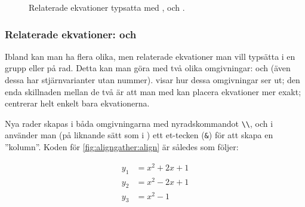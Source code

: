 \documentclass[lang=sv,ptsize=10pt,font=none,nomath,titles=bf,../../a4.tex]{subfiles}
\begin{document}
\begin{figure}[b]
	\centering 
	\quad
	\caption{Relaterade ekvationer typsatta med , 
	och .}
	\label{fig:aligngather}
\end{figure}
\clearpage

\subsubsection{Relaterade ekvationer:  och }
Ibland kan man ha flera olika, men relaterade ekvationer man vill typsätta
i en grupp eller på rad. Detta kan man göra med två olika omgivningar:
 och  (även dessa har stjärnvarianter utan nummer).
 visar hur dessa omgivningar ser ut; den enda
skillnaden mellan de två är att man med  kan placera ekvationer
mer exakt;  centrerar helt enkelt bara ekvationerna.

Nya rader skapas i båda omgivningarna med nyradskommandot \verb|\\|, och
i  använder man (på liknande sätt som i ) ett
et-tecken (\verb|&|) för att skapa en ”kolumn”. Koden för \cref{fig:aligngather:align} är således som följer:
\begin{latexcode}
\begin{align}
y_1 &= x^2 + 2x + 1 \\
y_2 &= x^2 - 2x + 1 \\
y_3 &= x^2 - 1
\end{align}
\end{latexcode}
\end{document}
